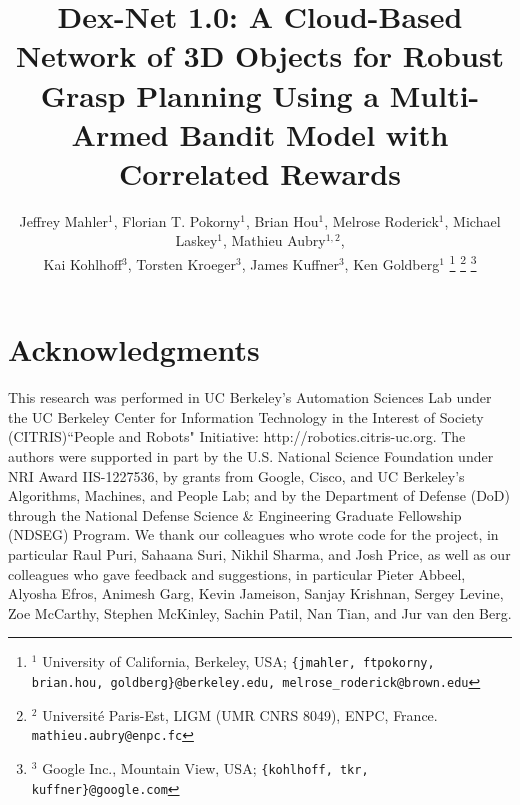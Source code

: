 \documentclass[letterpaper, 10 pt, conference]{ieeeconf}  %
\begin{document}
\title{\LARGE \bf Dex-Net 1.0: A Cloud-Based Network of 3D Objects for Robust Grasp Planning Using a Multi-Armed Bandit Model with Correlated Rewards
	\vspace{-2ex}
	}
\author{Jeffrey Mahler$^1$, Florian T. Pokorny$^1$, Brian Hou$^1$, Melrose Roderick$^1$, Michael Laskey$^1$, Mathieu Aubry$^{1,2}$, \\
Kai Kohlhoff$^3$, Torsten Kroeger$^3$, James Kuffner$^3$, Ken Goldberg$^{1}$
\thanks{{\small $^1$ University of California, Berkeley, USA; {\tt\small \{jmahler, ftpokorny, brian.hou, goldberg\}@berkeley.edu, melrose\_roderick@brown.edu}}}%
\thanks{{\small $^2$ Universit\'e Paris-Est, LIGM (UMR CNRS 8049), ENPC, France. {\tt\small mathieu.aubry@enpc.fc}}}%
\thanks{{\small $^3$ Google Inc., Mountain View, USA; {\tt\small \{kohlhoff, tkr, kuffner\}@google.com}} }
}
\maketitle


%


%


%




%

\section{Acknowledgments}
{\small
This research was performed in UC Berkeley's Automation Sciences Lab under the UC Berkeley Center for Information Technology in the Interest of Society (CITRIS)``People and Robots" Initiative: http://robotics.citris-uc.org.
The authors were supported in part by the U.S. National Science Foundation under NRI Award IIS-1227536, by grants from Google, Cisco, and UC Berkeley's Algorithms, Machines, and People Lab; and by the Department of Defense (DoD) through the National Defense Science \& Engineering Graduate Fellowship (NDSEG) Program.
We thank our colleagues who wrote code for the project, in particular Raul Puri, Sahaana Suri, Nikhil Sharma, and Josh Price, as well as our colleagues who gave feedback and suggestions, in particular Pieter Abbeel, Alyosha Efros, Animesh Garg, Kevin Jameison, Sanjay Krishnan, Sergey Levine, Zoe McCarthy, Stephen McKinley, Sachin Patil, Nan Tian, and Jur van den Berg.
}



\end{document}
